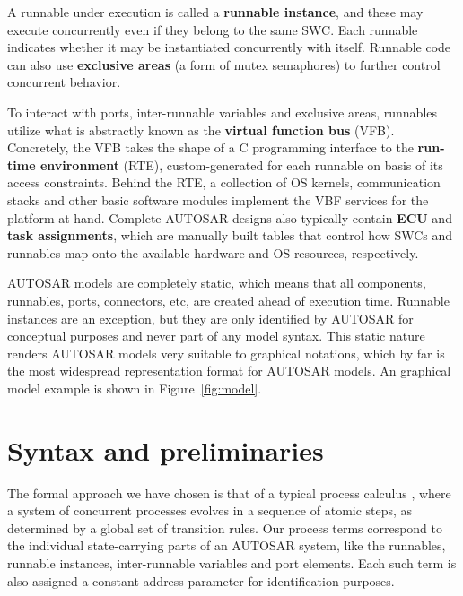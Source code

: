 \documentclass[twocolumn]{article}
\begin{document}
A runnable under execution is called a {\bf runnable instance}, and these may execute concurrently even if they belong to the same SWC. Each runnable indicates whether it may be instantiated concurrently with itself. Runnable code can also use {\bf exclusive areas} (a form of mutex semaphores) to further control concurrent behavior.

To interact with ports, inter-runnable variables and exclusive areas, runnables utilize what is abstractly known as the {\bf virtual function bus} (VFB). Concretely, the VFB takes the shape of a C programming interface to the {\bf run-time environment} (RTE), custom-generated for each runnable on basis of its access constraints. Behind the RTE, a collection of OS kernels, communication stacks and other basic software modules implement the VBF services for the platform at hand. Complete AUTOSAR designs also typically contain {\bf ECU} and {\bf task assignments}, which are manually built tables that control how SWCs and runnables map onto the available hardware and OS resources, respectively.

AUTOSAR models are completely static, which means that all components, runnables, ports, connectors, etc, are created ahead of execution time. Runnable instances are an exception, but they are only identified by AUTOSAR for conceptual purposes and never part of any model syntax. This static nature renders AUTOSAR models very suitable to graphical notations, which by far is the most widespread representation format for AUTOSAR models. An graphical model example is shown in Figure~\ref{fig:model}.

\section{Syntax and preliminaries}
\label{sec:Calc}

The formal approach we have chosen is that of a typical process calculus \cite{}, where a system of concurrent processes evolves in a sequence of atomic steps, as determined by a global set of transition rules. Our process terms correspond to the individual state-carrying parts of an AUTOSAR system, like the runnables, runnable instances, inter-runnable variables and port elements. Each such term is also assigned a constant address parameter for identification purposes.
\end{document}
